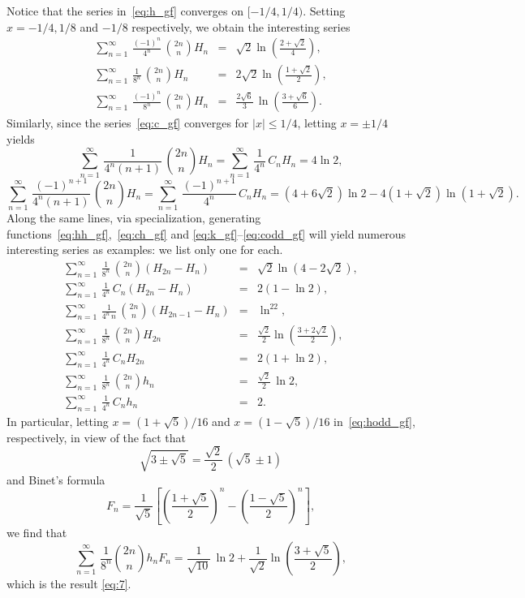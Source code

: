 \documentclass[12pt,reqno]{article}
\begin{document}
Notice that the series in~\eqref{eq:h_gf} converges on $[-1/4, 1/4)$. Setting $x =  -1/4, 1/8$ and $-1/8$ respectively, we obtain the interesting series
\begin{eqnarray*}
\sum_{n=1}^\infty\,\frac{(-1)^n}{4^n}\,\binom{2n}{n}H_n& = & \sqrt{2}\ln\left(\frac{2 + \sqrt{2}}{4}\right),\\
\sum_{n=1}^\infty\,\frac{1}{8^n}\,\binom{2n}{n}H_n & = & 2\sqrt{2}\ln\left(\frac{1 + \sqrt{2}}{2}\right),\\
\sum_{n=1}^\infty\,\frac{(-1)^n}{8^n}\,\binom{2n}{n}H_n & = & \frac{2\sqrt{6}}{3}\,\ln\left(\frac{3 + \sqrt{6}}{6}\right).
\end{eqnarray*}
Similarly, since the series~\eqref{eq:c_gf} converges for $|x| \leq 1/4$, letting $x = \pm 1/4$ yields
$$
\sum_{n=1}^\infty\,\frac{1}{4^n(n+1)}\,\binom{2n}{n}H_n = \sum_{n=1}^\infty\,\frac{1}{4^n}\,C_nH_n = 4\ln 2,
$$
$$
\sum_{n=1}^\infty\,\frac{(-1)^{n+1}}{4^n(n+1)}\,\binom{2n}{n}H_n = \sum_{n=1}^\infty\,\frac{(-1)^{n+1}}{4^n}\,C_nH_n = (4+6\sqrt{2})\ln 2  - 4(1+\sqrt{2})\ln(1 + \sqrt{2}). 
$$
Along the same lines, via specialization, generating functions~\eqref{eq:hh_gf},~\eqref{eq:ch_gf}  and \eqref{eq:k_gf}--\eqref{eq:codd_gf} will yield numerous interesting series as examples: we list only one for each.
\begin{eqnarray*}
\sum_{n=1}^\infty\,\frac{1}{8^n}\,\binom{2n}{n}(H_{2n} - H_n) & = & \sqrt{2}\ln(4 - 2\sqrt{2}),\\
\sum_{n=1}^\infty\,\frac{1}{4^n}\,C_n(H_{2n} -H_n) & = & 2(1- \ln 2),\\
\sum_{n=1}^\infty\,\frac{1}{4^n\,n}\,\binom{2n}{n}(H_{2n-1} - H_n) & = & \ln^22,\\
\sum_{n=1}^\infty\,\frac{1}{8^n}\,\binom{2n}{n}H_{2n}& = & \frac{\sqrt{2}}{2}\ln\left(\frac{3+2\sqrt{2}}{2}\right),\\
\sum_{n=1}^\infty\,\frac{1}{4^n}\,C_nH_{2n} & = & 2(1 + \ln 2),\\
\sum_{n=1}^\infty\,\frac{1}{8^n}\,\binom{2n}{n}h_{n}& = & \frac{\sqrt{2}}{2}\,\ln 2,\\
\sum_{n=1}^\infty\,\frac{1}{4^n}\,C_nh_{n} & = & 2.
\end{eqnarray*}
In particular, letting $x = (1+ \sqrt{5})/16$ and $ x = (1-\sqrt{5})/16$ in~\eqref{eq:hodd_gf}, respectively, in view of the fact that
$$\sqrt{3 \pm\sqrt{5}} = \frac{\sqrt{2}}{2}\,(\sqrt{5} \pm 1)$$
and Binet's formula
$$F_n = \frac{1}{\sqrt{5}}\left[\left(\frac{1+\sqrt{5}}{2}\right)^n - \left(\frac{1-\sqrt{5}}{2}\right)^n\right],$$
we find that
$$\sum_{n=1}^\infty\,\frac{1}{8^n}\binom{2n}{n}h_nF_n = \frac{1}{\sqrt{10}}\,\ln 2 + \frac{1}{\sqrt{2}}\ln\left(\frac{3 + \sqrt{5}}{2}\right),$$
which is the result \eqref{eq:7}.
\end{document}
